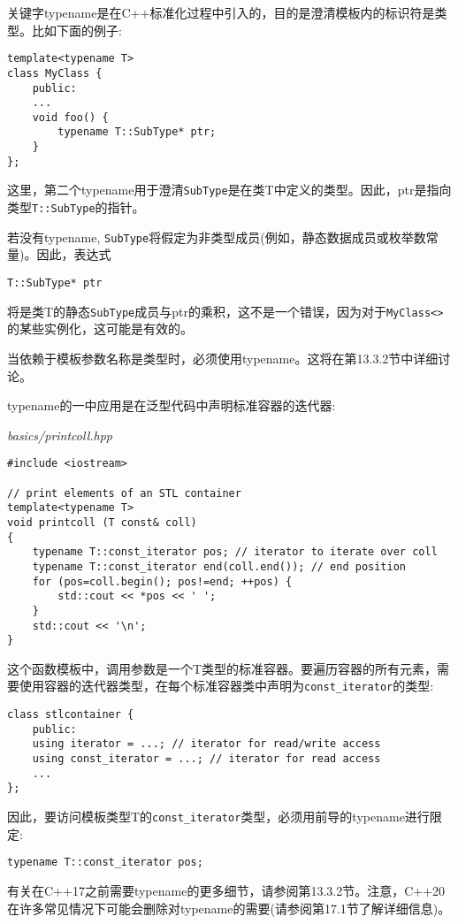 关键字typename是在C++标准化过程中引入的，目的是澄清模板内的标识符是类型。比如下面的例子:

\begin{lstlisting}[style=styleCXX]
template<typename T>
class MyClass {
	public:
	...
	void foo() {
		typename T::SubType* ptr;
	}
};
\end{lstlisting}

这里，第二个typename用于澄清\texttt{SubType}是在类T中定义的类型。因此，ptr是指向类型\texttt{T::SubType}的指针。

若没有typename, \texttt{SubType}将假定为非类型成员(例如，静态数据成员或枚举数常量)。因此，表达式

\begin{lstlisting}[style=styleCXX]
T::SubType* ptr
\end{lstlisting}

将是类T的静态\texttt{SubType}成员与ptr的乘积，这不是一个错误，因为对于\texttt{MyClass<>}的某些实例化，这可能是有效的。

当依赖于模板参数名称是类型时，必须使用typename。这将在第13.3.2节中详细讨论。

typename的一中应用是在泛型代码中声明标准容器的迭代器:

\noindent
\textit{basics/printcoll.hpp}
\begin{lstlisting}[style=styleCXX]
#include <iostream>

// print elements of an STL container
template<typename T>
void printcoll (T const& coll)
{
	typename T::const_iterator pos; // iterator to iterate over coll
	typename T::const_iterator end(coll.end()); // end position
	for (pos=coll.begin(); pos!=end; ++pos) {
		std::cout << *pos << ' ';
	}
	std::cout << '\n';
}
\end{lstlisting}

这个函数模板中，调用参数是一个T类型的标准容器。要遍历容器的所有元素，需要使用容器的迭代器类型，在每个标准容器类中声明为\texttt{const\_iterator}的类型:

\begin{lstlisting}[style=styleCXX]
class stlcontainer {
	public:
	using iterator = ...; // iterator for read/write access
	using const_iterator = ...; // iterator for read access
	...
};
\end{lstlisting}

因此，要访问模板类型T的\texttt{const\_iterator}类型，必须用前导的typename进行限定:

\begin{lstlisting}[style=styleCXX]
typename T::const_iterator pos;
\end{lstlisting}

有关在C++17之前需要typename的更多细节，请参阅第13.3.2节。注意，C++20在许多常见情况下可能会删除对typename的需要(请参阅第17.1节了解详细信息)。











